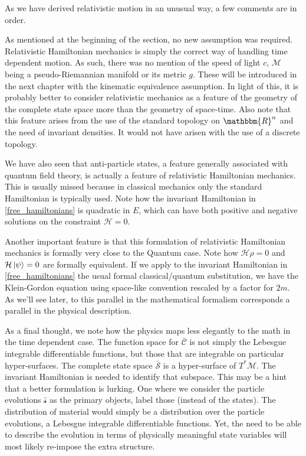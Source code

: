 \documentclass[aps,pra,10pt,twocolumn,floatfix,nofootinbib]{revtex4-1}
\numberwithin{equation}{section}
\theoremstyle{definition}
\begin{document}
As we have derived relativistic motion in an unusual way, a few comments are in order.

As mentioned at the beginning of the section, no new assumption was required. Relativistic Hamiltonian mechanics is simply the correct way of handling time dependent motion. As such, there was no mention of the speed of light $c$, $\mathcal{M}$ being a pseudo-Riemannian manifold or its metric $g$. These will be introduced in the next chapter with the kinematic equivalence assumption. In light of this, it is probably better to consider relativistic mechanics as a feature of the geometry of the complete state space more than the geometry of space-time. Also note that this feature arises from the use of the standard topology on $\mathbbm{R}^n$ and the need of invariant densities. It would not have arisen with the use of a discrete topology.

We have also seen that anti-particle states, a feature generally associated with quantum field theory, is actually a feature of relativistic Hamiltonian mechanics. This is usually missed because in classical mechanics only the standard Hamiltonian is typically used. Note how the invariant Hamiltonian in \ref{free_hamiltonians} is quadratic in $E$, which can have both positive and negative solutions on the constraint $\mathcal{H}=0$.

Another important feature is that this formulation of relativistic Hamiltonian mechanics is formally very close to the Quantum case. Note how $\mathcal{H} \rho = 0$ and $\mathcal{H} \ket{\psi} = 0$ are formally equivalent. If we apply to the invariant Hamiltonian in \ref{free_hamiltonians} the usual formal classical/quantum substitution, we have the Klein-Gordon equation using space-like convention rescaled by a factor for $2m$. As we'll see later, to this parallel in the mathematical formalism corresponds a parallel in the physical description.

As a final thought, we note how the physics maps less elegantly to the math in the time dependent case. The function space for $\bar{\mathcal{C}}$ is not simply the Lebesgue integrable differentiable functions, but those that are integrable on particular hyper-surfaces. The complete state space $\bar{\mathcal{S}}$ is a hyper-surface of $T^*\mathcal{M}$. The invariant Hamiltonian is needed to identify that subspace. This may be a hint that a better formulation is lurking. One where we consider the particle evolutions $\bar{\mathcal{s}}$ as the primary objects, label those (instead of the states). The distribution of material would simply be a distribution over the particle evolutions, a Lebesgue integrable differentiable functions. Yet, the need to be able to describe the evolution in terms of physically meaningful state variables will most likely re-impose the extra structure.
\end{document}
